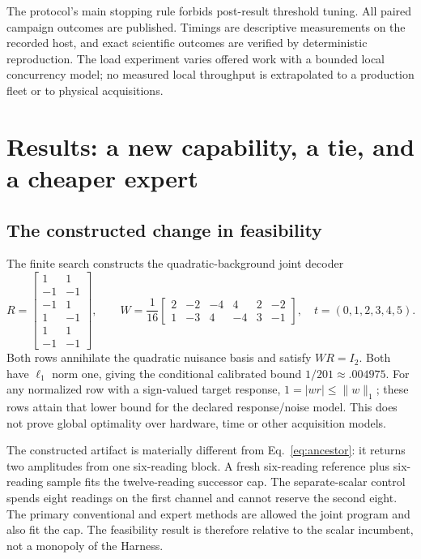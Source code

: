 \documentclass[11pt]{article}
\begin{document}
The protocol's main stopping rule forbids post-result threshold tuning. All paired campaign outcomes are published. Timings are descriptive measurements on the recorded host, and exact scientific outcomes are verified by deterministic reproduction. The load experiment varies offered work with a bounded local concurrency model; no measured local throughput is extrapolated to a production fleet or to physical acquisitions.



\section{Results: a new capability, a tie, and a cheaper expert}
\label{sec:results}

\subsection{The constructed change in feasibility}

The finite search constructs the quadratic-background joint decoder
\begin{equation}
R=\begin{bmatrix}1&1\\-1&-1\\-1&1\\1&-1\\1&1\\-1&-1\end{bmatrix},\qquad
W=\frac1{16}\begin{bmatrix}2&-2&-4&4&2&-2\\1&-3&4&-4&3&-1\end{bmatrix},
\quad t=(0,1,2,3,4,5).
\label{eq:joint}
\end{equation}
Both rows annihilate the quadratic nuisance basis and satisfy $WR=I_2$. Both have $\ell_1$ norm one, giving the conditional calibrated bound $1/201\approx.004975$. For any normalized row with a sign-valued target response, $1=|wr|\leq\|w\|_1$; these rows attain that lower bound for the declared response/noise model. This does not prove global optimality over hardware, time or other acquisition models.

The constructed artifact is materially different from Eq.~\eqref{eq:ancestor}: it returns two amplitudes from one six-reading block. A fresh six-reading reference plus six-reading sample fits the twelve-reading successor cap. The separate-scalar control spends eight readings on the first channel and cannot reserve the second eight. The primary conventional and expert methods are allowed the joint program and also fit the cap. The feasibility result is therefore relative to the scalar incumbent, not a monopoly of the Harness.
\end{document}
